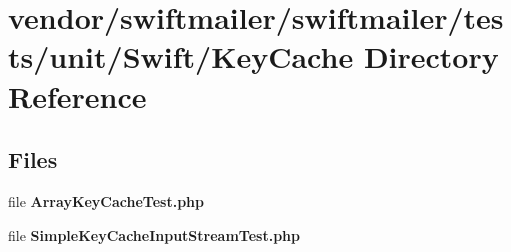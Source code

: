 \section{vendor/swiftmailer/swiftmailer/tests/unit/\+Swift/\+Key\+Cache Directory Reference}
\label{dir_52e520d7770477fbc8f5156e70f58cc8}
\subsection*{Files}
\begin{DoxyCompactItemize}
\item 
file {\bf Array\+Key\+Cache\+Test.\+php}
\item 
file {\bf Simple\+Key\+Cache\+Input\+Stream\+Test.\+php}
\end{DoxyCompactItemize}
